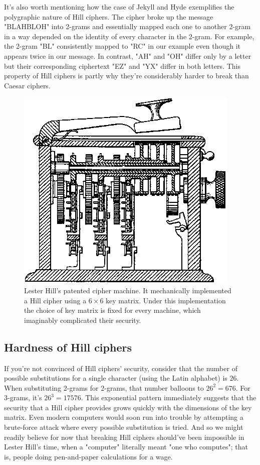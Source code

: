 \documentclass{paper}
\begin{document}
\medskip
It's also worth mentioning how the case of Jekyll and Hyde exemplifies the polygraphic nature of Hill ciphers. The cipher broke up the message "BLAHBLOH" into 2-grams and essentially mapped each one to another 2-gram in a way depended on the identity of every character in the 2-gram. For example, the 2-gram "BL" consistently mapped to "RC" in our example even though it appears twice in our message. In contrast, "AH" and "OH" differ only by a letter but their corresponding ciphertext "EZ" and "YX" differ in both letters. This property of Hill ciphers is partly why they're considerably harder to break than Caesar ciphers.

\begin{figure}
    \centering
    \includegraphics[scale=0.25]{images/cipher-machine.png}
    \caption{Lester Hill's patented cipher machine. It mechanically implemented a Hill cipher using a $6 \times 6$ key matrix. Under this implementation the choice of key matrix is fixed for every machine, which imaginably complicated their security.}
    \label{fig:my_label}
\end{figure}

\subsection{Hardness of Hill ciphers}

If you're not convinced of Hill ciphers' security, consider that the number of possible substitutions for a single character (using the Latin alphabet) is $26$. When substituting 2-grams for 2-grams, that number balloons to $26^2 = 676$. For 3-grams, it's $26^3 = 17576$. This exponential pattern immediately suggests that the security that a Hill cipher provides grows quickly with the dimensions of the key matrix. Even modern computers would soon run into trouble by attempting a brute-force attack where every possible substitution is tried. And so we might readily believe for now that breaking Hill ciphers should've been impossible in Lester Hill's time, when a "computer" literally meant "one who computes"; that is, people doing pen-and-paper calculations for a wage. 
\end{document}
